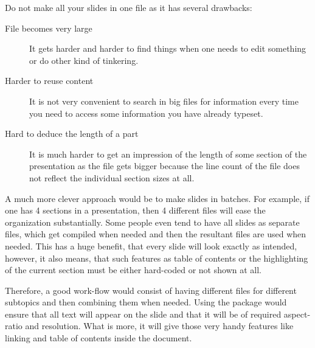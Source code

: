 \documentclass[
    draft
]{scrartcl}
\begin{document}
%

%
Do not make all your slides in one file as it has several drawbacks:
\begin{description}
    \item[File becomes very large]
        It gets harder and harder to find things when one needs to edit
            something or do other kind of tinkering.
    \item[Harder to reuse content]
        It is not very convenient to search in big files for information
            every time you need to access some information you have already
            typeset.
    \item[Hard to deduce the length of a part]
        It is much harder to get an impression of the length of some section of
            the presentation as the file gets bigger because the line count of
            the file does not reflect the individual section sizes at all.
\end{description}

%
A much more clever approach would be to make slides in batches.
%
For example, if one has 4 sections in a presentation, then 4 different files
    will ease the organization substantially.
%
Some people even tend to have all slides as separate  files, which
    get compiled when needed and then the resultant  files are used
    when needed.
%
This has a huge benefit, that every slide will look exactly as intended,
    however, it also means, that such features as table of contents or the
    highlighting of the current section must be either hard-coded or not shown
    at all.

%
Therefore, a good work-flow would consist of having different  files
    for different subtopics and then combining them when needed.
%
Using the  package would ensure that all text will appear on the
    slide and that it will be of required aspect-ratio and resolution.
%
What is more, it will give those very handy features like linking and table of
    contents inside the document.



\end{document}
